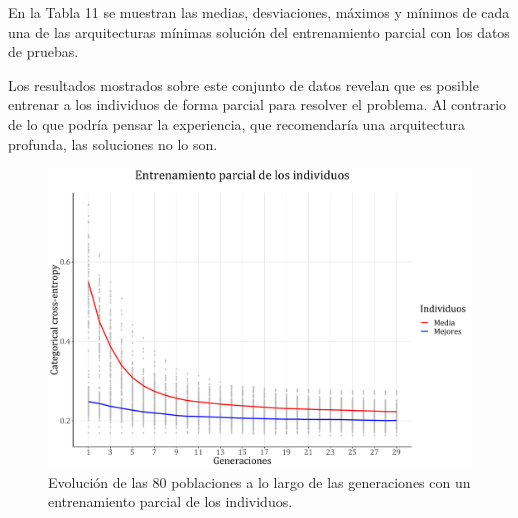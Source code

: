 \documentclass[spanish,a4paper,12pt,twoside]{report}
\begin{document}
  En la Tabla 11 se muestran las medias, desviaciones, máximos y mínimos de cada una de las arquitecturas mínimas solución del entrenamiento parcial con los datos de pruebas. \par
  Los resultados mostrados sobre este conjunto de datos revelan que es posible entrenar a los individuos de forma parcial para resolver el problema. Al contrario de lo que podría pensar la experiencia, que recomendaría una arquitectura profunda, las soluciones no lo son.
  \begin{figure}[H]
    \centering
    \includegraphics[width = 1\textwidth]{resources/Fig24.pdf}
    \caption{Evolución de las 80 poblaciones a lo largo de las generaciones con un entrenamiento parcial de los individuos.}
    \label{fig:24}
  \end{figure} \par
\end{document}
